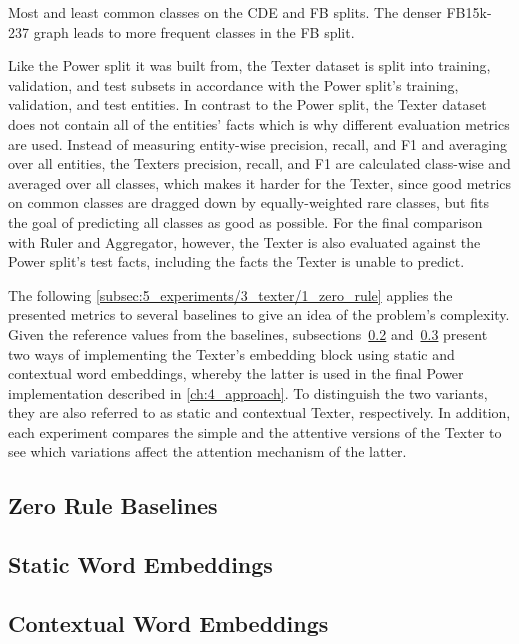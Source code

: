 \begin{table}[h]
    \centering
    
    \caption{Most and least common classes on the CDE and FB splits. The denser FB15k-237 graph leads to more frequent classes in the FB split.}
    \label{tab:5_experiments/3_texter/classes}
\end{table}

Like the Power split it was built from, the Texter dataset is split into training, validation, and test subsets in accordance with the Power split's training, validation, and test entities. In contrast to the Power split, the Texter dataset does not contain all of the entities' facts which is why different evaluation metrics are used. Instead of measuring entity-wise precision, recall, and F1 and averaging over all entities, the Texters precision, recall, and F1 are calculated class-wise and averaged over all classes, which makes it harder for the Texter, since good metrics on common classes are dragged down by equally-weighted rare classes, but fits the goal of predicting all classes as good as possible. For the final comparison with Ruler and Aggregator, however, the Texter is also evaluated against the Power split's test facts, including the facts the Texter is unable to predict.

The following \autoref{subsec:5_experiments/3_texter/1_zero_rule} applies the presented metrics to several baselines to give an idea of the problem's complexity. Given the reference values from the baselines, subsections~\ref{subsec:5_experiments/3_texter/2_static} and~\ref{subsec:5_experiments/3_texter/3_context} present two ways of implementing the Texter's embedding block using static and contextual word embeddings, whereby the latter is used in the final Power implementation described in \autoref{ch:4_approach}. To distinguish the two variants, they are also referred to as static and contextual Texter, respectively. In addition, each experiment compares the simple and the attentive versions of the Texter to see which variations affect the attention mechanism of the latter.

\subsection{Zero Rule Baselines}
\label{subsec:5_experiments/3_texter/1_zero_rule}


\subsection{Static Word Embeddings}
\label{subsec:5_experiments/3_texter/2_static}


\subsection{Contextual Word Embeddings}
\label{subsec:5_experiments/3_texter/3_context}

